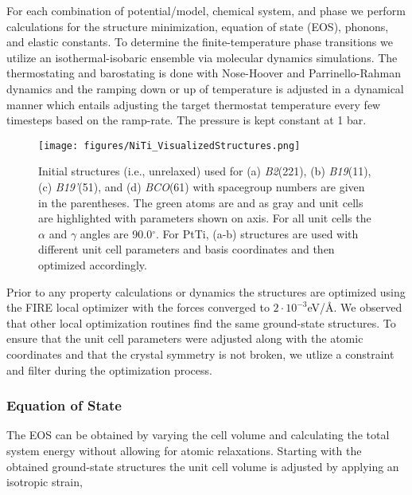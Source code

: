 \documentclass[preprint,colorlinks=true,linkcolor=black,citecolor=black]{elsarticle}
\begin{document}
For each combination of potential/model, chemical system, and phase we
perform calculations for the structure minimization, equation of state
(EOS), phonons, and elastic constants. To determine the
finite-temperature phase transitions we utilize an isothermal-isobaric
ensemble via molecular dynamics simulations. The thermostating and
barostating is done with Nose-Hoover and Parrinello-Rahman dynamics
and the ramping down or up of temperature is adjusted in a dynamical manner
which entails adjusting the target thermostat temperature every few timesteps
based on the ramp-rate. The pressure is kept constant at 1 bar.

\begin{figure}[ht!]
	\begin{centering}
		\texttt{[image: figures/NiTi\_VisualizedStructures.png]}
		\caption{ Initial  structures (i.e., unrelaxed) used for
			(a) \textit{B2}(221), (b) \textit{B19}(11), (c)
			\textit{B19'}(51), and (d) \textit{BCO}(61) with spacegroup
			numbers are given in the parentheses. The green atoms are
			 and  as gray and unit cells are highlighted with
			parameters shown on axis. For all unit cells the $\alpha$ and
			$\gamma$ angles are 90.0$^\circ$. For PtTi, (a-b) structures are
			used with different unit cell parameters and basis coordinates
			and then optimized accordingly.  }
		\label{fig:niti_structures}
	\end{centering}
\end{figure}

Prior to any property calculations or dynamics the structures are
optimized using the FIRE\cite{Bitzek2006} local optimizer with the
forces converged to $2\cdot 10^{-3}$eV/\AA\@. We observed that other
local optimization routines find the same ground-state structures. To
ensure that the unit cell parameters were adjusted along with the
atomic coordinates and that the crystal symmetry is not broken, we
utlize a constraint and filter during the optimization process. \par

\subsubsection{Equation of State}
The EOS can be obtained by varying the cell volume and calculating the
total system energy without allowing for atomic relaxations. Starting
with the obtained ground-state structures the unit cell volume is
adjusted by applying an isotropic strain,
\end{document}
